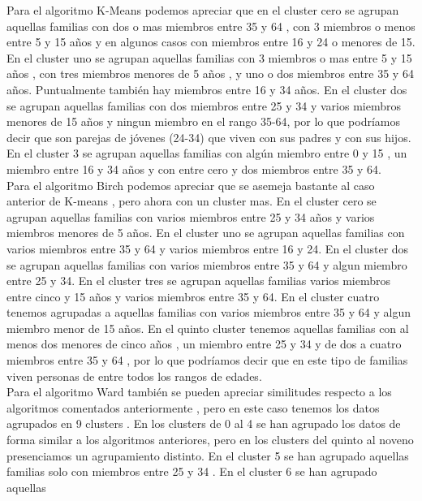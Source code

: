 	Para el algoritmo K-Means podemos apreciar que en el cluster cero se agrupan aquellas 
	familias con dos o mas miembros entre 35 y 64 , con 3 miembros o menos entre 5 y 15 años y en algunos casos con miembros entre
	16 y 24 o menores de 15. En el cluster uno se agrupan aquellas familias con 3 miembros o mas entre 5 y 15 años , con 
	tres miembros menores de 5 años , y uno o dos miembros entre 35 y 64 años. Puntualmente también hay miembros entre 
	16 y 34 años. En el cluster dos se agrupan aquellas familias con dos miembros entre 25 y 34 y varios miembros menores de 15 años y ningun miembro
	en el rango 35-64, por lo que podríamos decir que son parejas de jóvenes (24-34) que viven con sus padres y con sus hijos. 
	En el cluster 3 se agrupan aquellas familias con algún miembro entre 0 y 15 , un miembro entre 16 y 34 años y 
	con entre cero y dos miembros entre 35 y 64. \\
	Para el algoritmo Birch podemos apreciar que se asemeja bastante al caso anterior de 
	K-means , pero ahora con un cluster mas. En el cluster cero se agrupan aquellas familias con varios miembros entre 
	25 y 34 años y varios miembros menores de 5 años. En el cluster uno se agrupan aquellas familias con varios miembros 
	entre 35 y 64 y varios miembros entre 16 y 24. En el cluster dos se agrupan aquellas familias con varios miembros entre
	35 y 64 y algun miembro entre 25 y 34. En el cluster tres se agrupan aquellas familias varios miembros entre cinco
	y 15 años y varios miembros entre 35 y 64. En el cluster cuatro tenemos agrupadas a aquellas familias con varios miembros
	entre 35 y 64 y algun miembro menor de 15 años. En el quinto cluster tenemos aquellas familias con al menos dos menores
	de cinco años , un miembro entre 25 y 34 y de dos a cuatro miembros entre 35 y 64 , por lo que podríamos decir que en este tipo
	de familias viven personas de entre todos los rangos de edades.  \\
	Para el algoritmo Ward también se pueden apreciar similitudes respecto a los algoritmos comentados anteriormente , pero
	en este caso tenemos los datos agrupados en 9 clusters . En los clusters de 0 al 4 se han agrupado los datos de forma
	similar a los algoritmos anteriores, pero en los clusters del quinto al noveno presenciamos un agrupamiento distinto.
	En el cluster 5 se han agrupado aquellas familias solo con miembros entre 25 y 34 . En el cluster 6 se han agrupado aquellas
